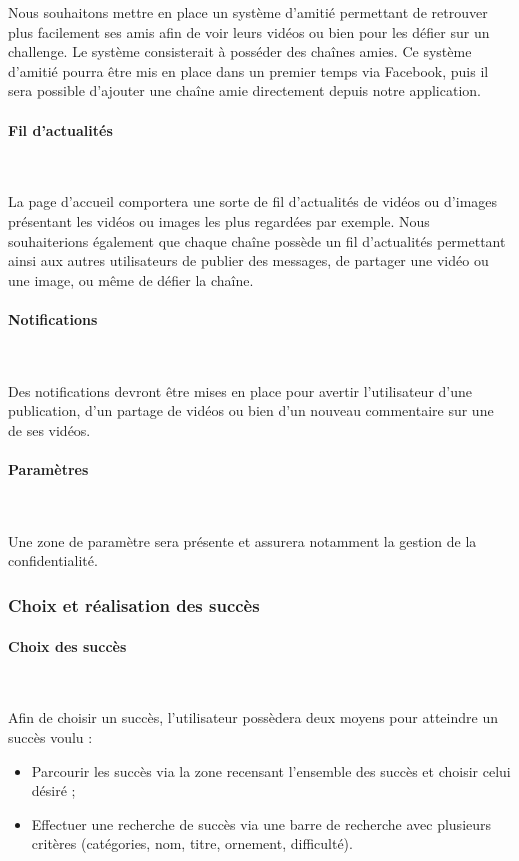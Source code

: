 \documentclass[a4paper,10pt]{article}
\begin{document}
Nous souhaitons mettre en place un système d'amitié permettant de retrouver plus facilement ses amis afin de voir leurs vidéos ou bien pour les défier sur un challenge. Le système consisterait à posséder des chaînes amies. Ce système d'amitié pourra être mis en place dans un premier temps via Facebook, puis il sera possible d'ajouter une chaîne amie directement depuis notre application. 

\paragraph{Fil d'actualités}~\

La page d'accueil comportera une sorte de fil d'actualités de vidéos ou d'images présentant les vidéos ou images les plus regardées par exemple. Nous souhaiterions également que chaque chaîne possède un fil d'actualités permettant ainsi aux autres utilisateurs de publier des messages, de partager une vidéo ou une image, ou même de défier la chaîne.

\paragraph{Notifications}~\

Des notifications devront être mises en place pour avertir l'utilisateur d'une publication, d'un partage de vidéos ou bien d'un nouveau commentaire sur une de ses vidéos.

\paragraph{Paramètres}~\

Une zone de paramètre sera présente et assurera notamment la gestion de la confidentialité.

\subsubsection{Choix et réalisation des succès}

\paragraph{Choix des succès}~\

Afin de choisir un succès, l'utilisateur possèdera deux moyens pour atteindre un succès voulu :
\begin{itemize}
\item Parcourir les succès via la zone recensant l'ensemble des succès et choisir celui désiré ;
\item Effectuer une recherche de succès via une barre de recherche avec plusieurs critères (catégories, nom, titre, ornement, difficulté).
\end{itemize}
\end{document}
